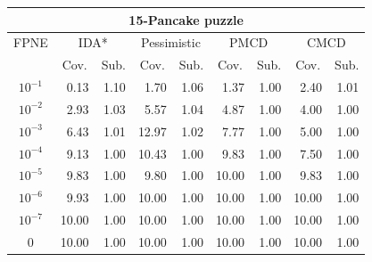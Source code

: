 \documentclass[letterpaper]{article}
\begin{document}
\begin{table}[t]
\centering
\footnotesize
\setlength{\tabcolsep}{4.0 pt}
\begin{tabular}{| c | r  r | r  r | r  r | r  r |}
\hline
\multicolumn{9}{|c|}{\textbf{15-Pancake puzzle}} \\
\hline
FPNE     & \multicolumn{2}{|c|}{IDA*}    & \multicolumn{2}{|c|}{Pessimistic}     & \multicolumn{2}{|c|}{PMCD}    & \multicolumn{2}{|c|}{CMCD}    \\
\hline
        & \multicolumn{1}{c}{Cov.} & \multicolumn{1}{c|}{Sub.}        & \multicolumn{1}{c}{Cov.} & \multicolumn{1}{c|}{Sub.}        & \multicolumn{1}{c}{Cov.} & \multicolumn{1}{c|}{Sub.}        & \multicolumn{1}{c}{Cov.} & \multicolumn{1}{c|}{Sub.}        \\
\hline
$10^{-1}$        & 0.13  & 1.10  & 1.70         & 1.06         & 1.37         & 1.00         & 2.40         & 1.01        \\
$10^{-2}$        & 2.93  & 1.03  & 5.57         & 1.04         & 4.87         & 1.00         & 4.00         & 1.00        \\
$10^{-3}$        & 6.43  & 1.01  & 12.97        & 1.02         & 7.77         & 1.00         & 5.00  & 1.00 \\
$10^{-4}$        & 9.13  & 1.00  & 10.43       & 1.00         & 9.83         & 1.00        & 7.50  & 1.00 \\
$10^{-5}$        & 9.83  & 1.00  & 9.80  & 1.00  & 10.00        & 1.00         & 9.83         & 1.00        \\
$10^{-6}$	 & 9.93	 & 1.00	 & 10.00	 & 1.00	 & 10.00	 & 1.00	 & 10.00	 & 1.00	\\
$10^{-7}$	 & 10.00	 & 1.00	 & 10.00	 & 1.00	 & 10.00	 & 1.00	 & 10.00	 & 1.00	\\
0        & 10.00         & 1.00          & 10.00        & 1.00         & 10.00        & 1.00         & 10.00        & 1.00        \\

\end{tabular}
\end{table}
\end{document}
